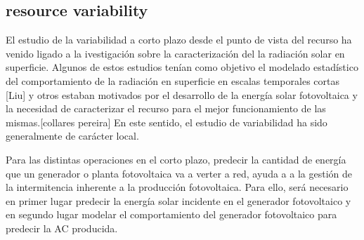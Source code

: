 \subsection{resource variability}

El estudio de la variabilidad a corto plazo desde el punto de vista del recurso ha venido ligado a la ivestigación sobre la caracterización del la radiación solar en superficie. Algunos de estos estudios tenían como objetivo el modelado estadístico del comportamiento de la radiación en superficie en escalas temporales cortas [Liu] y otros estaban motivados por el desarrollo de la energía solar fotovoltaica y la necesidad de caracterizar el recurso para el mejor funcionamiento de las mismas.[collares pereira] En este sentido, el estudio de variabilidad ha sido generalmente de carácter local.

{\color{red}Para las distintas operaciones en el corto plazo, predecir la cantidad de energía que un generador o planta fotovoltaica va a verter a red, ayuda a a la gestión de la intermitencia inherente a la producción fotovoltaica. Para ello, será necesario en primer lugar predecir la energía solar incidente en el generador fotovoltaico y en segundo lugar modelar el comportamiento del generador fotovoltaico para predecir la AC producida.}
 



